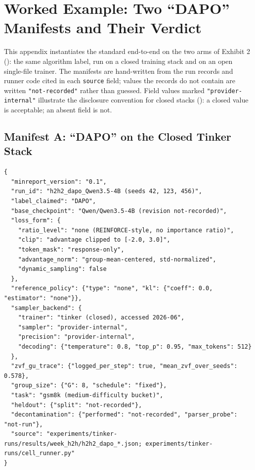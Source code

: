 \section{Worked Example: Two ``DAPO'' Manifests and Their Verdict}
\label{app:p5-worked}
This appendix instantiates the standard end-to-end on the two arms of
Exhibit 2 (): the same algorithm label, run on a
closed training stack and on an open single-file trainer. The manifests are
hand-written from the run records and runner code cited in each
\texttt{source} field; values the records do not contain are written
\texttt{"not-recorded"} rather than guessed. Field values marked
\texttt{"provider-internal"} illustrate the disclosure convention for closed
stacks (): a closed value is acceptable; an absent
field is not.

\subsection{Manifest A: ``DAPO'' on the Closed Tinker Stack}
\label{app:p5-manifest-a}
\begin{lstlisting}[basicstyle=\ttfamily\footnotesize, frame=single,
                   breaklines=true, columns=fullflexible]
{
  "minreport_version": "0.1",
  "run_id": "h2h2_dapo_Qwen3.5-4B (seeds 42, 123, 456)",
  "label_claimed": "DAPO",
  "base_checkpoint": "Qwen/Qwen3.5-4B (revision not-recorded)",
  "loss_form": {
    "ratio_level": "none (REINFORCE-style, no importance ratio)",
    "clip": "advantage clipped to [-2.0, 3.0]",
    "token_mask": "response-only",
    "advantage_norm": "group-mean-centered, std-normalized",
    "dynamic_sampling": false
  },
  "reference_policy": {"type": "none", "kl": {"coeff": 0.0, "estimator": "none"}},
  "sampler_backend": {
    "trainer": "tinker (closed), accessed 2026-06",
    "sampler": "provider-internal",
    "precision": "provider-internal",
    "decoding": {"temperature": 0.8, "top_p": 0.95, "max_tokens": 512}
  },
  "zvf_gu_trace": {"logged_per_step": true, "mean_zvf_over_seeds": 0.578},
  "group_size": {"G": 8, "schedule": "fixed"},
  "task": "gsm8k (medium-difficulty bucket)",
  "heldout": {"split": "not-recorded"},
  "decontamination": {"performed": "not-recorded", "parser_probe": "not-run"},
  "source": "experiments/tinker-runs/results/week_h2h/h2h2_dapo_*.json; experiments/tinker-runs/cell_runner.py"
}
\end{lstlisting}


